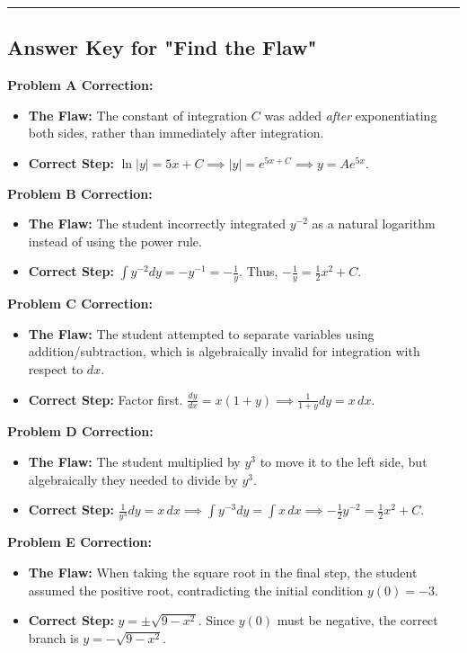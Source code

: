 \documentclass[11pt]{article}
\begin{document}
\vspace{0.5cm}
\hrule
\vspace{0.5cm}

\subsection*{Answer Key for "Find the Flaw"}

\textbf{Problem A Correction:}
\begin{itemize}
    \item \textbf{The Flaw:} The constant of integration $C$ was added \textit{after} exponentiating both sides, rather than immediately after integration.
    \item \textbf{Correct Step:} $\ln|y| = 5x + C \implies |y| = e^{5x+C} \implies y = A e^{5x}$.
\end{itemize}

\textbf{Problem B Correction:}
\begin{itemize}
    \item \textbf{The Flaw:} The student incorrectly integrated $y^{-2}$ as a natural logarithm instead of using the power rule.
    \item \textbf{Correct Step:} $\int y^{-2} dy = -y^{-1} = -\frac{1}{y}$. Thus, $-\frac{1}{y} = \frac{1}{2}x^2 + C$.
\end{itemize}

\textbf{Problem C Correction:}
\begin{itemize}
    \item \textbf{The Flaw:} The student attempted to separate variables using addition/subtraction, which is algebraically invalid for integration with respect to $dx$.
    \item \textbf{Correct Step:} Factor first. $\frac{dy}{dx} = x(1+y) \implies \frac{1}{1+y} dy = x \, dx$.
\end{itemize}

\textbf{Problem D Correction:}
\begin{itemize}
    \item \textbf{The Flaw:} The student multiplied by $y^3$ to move it to the left side, but algebraically they needed to divide by $y^3$.
    \item \textbf{Correct Step:} $\frac{1}{y^3} dy = x \, dx \implies \int y^{-3} dy = \int x \, dx \implies -\frac{1}{2}y^{-2} = \frac{1}{2}x^2 + C$.
\end{itemize}

\textbf{Problem E Correction:}
\begin{itemize}
    \item \textbf{The Flaw:} When taking the square root in the final step, the student assumed the positive root, contradicting the initial condition $y(0) = -3$.
    \item \textbf{Correct Step:} $y = \pm \sqrt{9 - x^2}$. Since $y(0)$ must be negative, the correct branch is $y = -\sqrt{9 - x^2}$.
\end{itemize}
\end{document}
